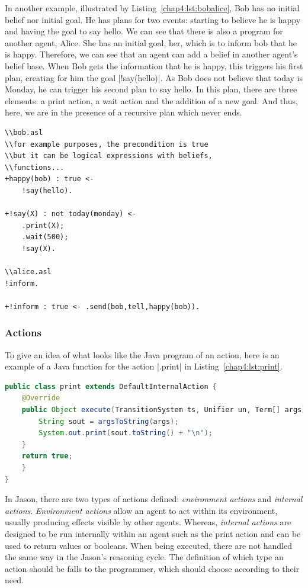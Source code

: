 \documentclass[a4paper,11pt,twoside]{StyleThese}
\begin{document}
In another example, illustrated by Listing~\ref{chap4:lst:bobalice}, Bob has no initial belief nor initial goal. He has plans for two events: starting to believe he is happy and having the goal to say hello. We can see that there is also a program for another agent, Alice. She has an initial goal, her, which is to inform bob that he is happy. Therefore, we can see that an agent can add a belief in another agent's belief base. When Bob gets the information that he is happy, this triggers his first plan, creating for him the goal |!say(hello)|. As Bob does not believe that today is Monday, he can trigger his second plan to say hello. In this plan, there are three elements: a print action, a wait action and the addition of a new goal. And thus, here, we are in the presence of a recursive plan which never ends. 

\begin{lstlisting}[caption={ASL programs of Bob and Alice, two Jason agents}, label={chap4:lst:bobalice}]
\\bob.asl
\\for example purposes, the precondition is true
\\but it can be logical expressions with beliefs,
\\functions...
+happy(bob) : true <- 
	!say(hello).

+!say(X) : not today(monday) <- 
	.print(X); 
	.wait(500); 
	!say(X).

\\alice.asl
!inform.

+!inform : true <- .send(bob,tell,happy(bob)).
\end{lstlisting} 

\subsubsection{Actions} To give an idea of what looks like the Java program of an action, here is an example of a Java function for the action |.print| in Listing~\ref{chap4:lst:print}.

\begin{lstlisting}[caption={.print action}, label={chap4:lst:print}, language=Java]
public class print extends DefaultInternalAction {
	@Override
	public Object execute(TransitionSystem ts, Unifier un, Term[] args) throws Exception {
		String sout = argsToString(args);
		System.out.print(sout.toString() + "\n");
	}
	return true;
	}
}
\end{lstlisting} 

In Jason, there are two types of actions defined: \emph{environment actions} and \emph{internal actions}. \emph{Environment actions} allow an agent to act within its environment, usually producing effects visible by other agents. Whereas, \emph{internal actions} are designed to be run internally within an agent such as the print action and can be used to return values or booleans. When being executed, there are not handled the same way in the Jason's reasoning cycle. The definition of which type an action should be falls to the programmer, which should choose according to their need.
\end{document}
